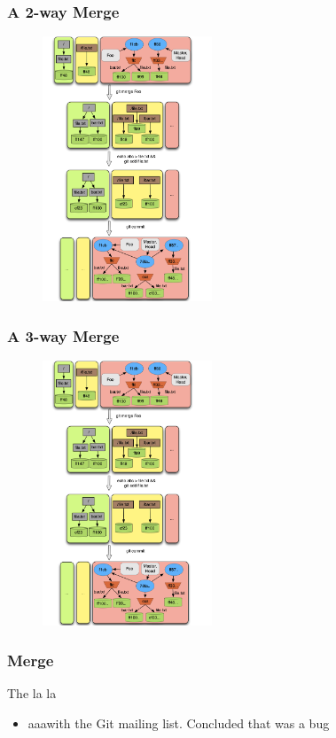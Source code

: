 \documentclass{beamer}
\begin{document}
\begin{frame}[fragile]
   \frametitle{A 2-way Merge}
   \begin{figure}
      \centering
      \includegraphics[width=0.45\textwidth]{images/merge2way.png}
   \end{figure}
\end{frame}

\begin{frame}[fragile]
   \frametitle{A 3-way Merge}
   \begin{figure}
      \centering
      \includegraphics[width=0.45\textwidth]{images/merge2way.png}
   \end{figure}
\end{frame}

\begin{frame}[fragile]
	\frametitle{Merge}
	\begin{block}{The la la} 
	\begin{itemize}
		\item aaawith the Git mailing list. Concluded that was a bug
	\end{itemize}
	\end{block}
\end{frame}
\end{document}

